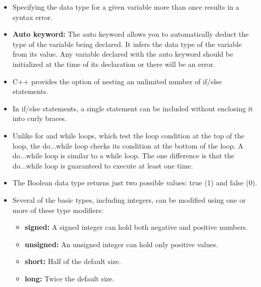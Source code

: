 \documentclass[12pt , a4paper]{article}
\begin{document}
\begin{itemize}
			\item Specifying the data type for a given variable more than once results in a syntax error.\\
			\item \textbf{Auto keyword:} The auto keyword allows you to automatically deduct the type of the variable being declared. It infers the data type of the variable from its value. Any variable declared with the auto keyword should be initialized at the time of its declaration or there will be an error.\\
			\item C++ provides the option of nesting an unlimited number of if/else statements.\\
			\item In if/else statements, a single statement can be included without enclosing it into curly braces.\\
			\item Unlike for and while loops, which test the loop condition at the top of the loop, the do...while loop checks its condition at the bottom of the loop. A do...while loop is similar to a while loop. The one difference is that the do...while loop is guaranteed to execute at least one time.\\
			\item The Boolean data type returns just two possible values: true (1) and false (0).\\	
			\item Several of the basic types, including integers, can be modified using one or more of these type modifiers:\\
			\begin{itemize}
				\item \textbf{signed:} A signed integer can hold both negative and positive numbers.\\
				\item \textbf{unsigned:} An unsigned integer can hold only positive values.\\
				\item \textbf{short:} Half of the default size.\\
				\item \textbf{long:} Twice the default size.\\
			\end{itemize}

		\end{itemize}
\end{document}
